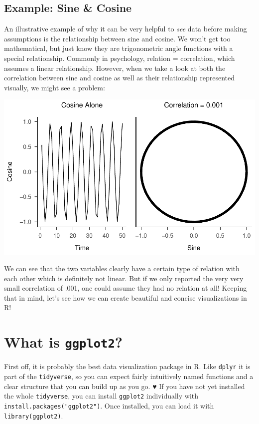 \documentclass[
]{book}
\begin{document}
\subsection{Example: Sine \& Cosine}\label{example-sine-cosine}

An illustrative example of why it can be very helpful to \emph{see} data before making assumptions is the relationship between sine and cosine.
We won't get too mathematical, but just know they are trigonometric angle functions with a special relationship.
Commonly in psychology, relation = correlation, which assumes a linear relationship.
However, when we take a look at both the correlation between sine and cosine as well as their relationship represented visually, we might see a problem:

\includegraphics{_main_files/figure-html/unnamed-chunk-30-1.pdf}

We can see that the two variables clearly have a certain type of relation with each other which is definitely not linear.
But if we only reported the very very small correlation of .001, one could assume they had no relation at all!
Keeping that in mind, let's see how we can create beautiful and concise visualizations in R!

\section{\texorpdfstring{What is \texttt{ggplot2}?}{What is ggplot2?}}\label{what-is-ggplot2}

First off, it is probably the best data visualization package in R.
Like \texttt{dplyr} it is part of the \texttt{tidyverse}, so you can expect fairly intuitively named functions and a clear structure that you can build up as you go. ♥
If you have not yet installed the whole \texttt{tidyverse}, you can install \texttt{ggplot2} individually with \texttt{install.packages("ggplot2")}.
Once installed, you can load it with \texttt{library(ggplot2)}.
\end{document}
